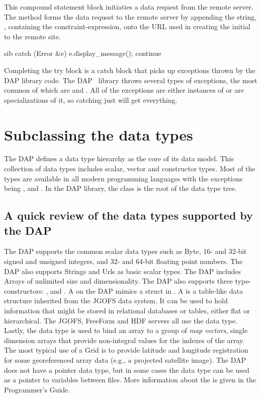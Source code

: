 \documentclass{dods-paper}
\begin{document}
This compound statement block initiaties a data request from the remote
server. The  method  forms the data request
to the remote server by appending the string, , containing the
constraint-expression, onto the URL used in creating the initial
 to the remote site.

\begin{vcode}{sib}
catch (Error &e) {
    e.display_message();
    continue
}
\end{vcode}
 
Completing the try block is a catch block that picks up exceptions thrown by
the DAP library code. The DAP \Cpp\ library throws several types of exceptions,
the most common of which are  and . All of
the exceptions are either instances of  or are specializations
of it, so catching just  will get everything.

\section{Subclassing the data types}

The DAP defines a data type hierarchy as the core of its data model. This
collection of data types includes scalar, vector and constructor types. Most
of the types are available in all modern programming languages with the
exceptions being ,  and . In the DAP
library, the class  is the root of the data type tree.

\subsection{A quick review of the data types supported by the DAP}

The DAP supports the common scalar data types such as Byte, 16- and 32-bit
signed and unsigned integers, and 32- and 64-bit floating point numbers. The
DAP also supports Strings and Urls as basic scalar types. The DAP includes
Arrays of unlimited size and dimensionality. The DAP also supports three
type-constructors: ,  and . A
 on the DAP mimics a struct in . A  is a
table-like data structure inherited from the JGOFS data system. It can be
used to hold information that might be stored in relational databases or
tables, either flat or hierarchical. The JGOFS, FreeForm and HDF servers all
use the  data type. Lastly, the  data type is used to
bind an array to a group of \emph{map vectors}, single dimension arrays that
provide non-integral values for the indexes of the array. The most typical
use of a Grid is to provide latitude and longitude registration for some
georeferenced array data (e.g., a projected satellite image). The DAP does
not have a pointer data type, but in some cases the  data type can
be used as a pointer to variables between files. More information about the
is given in the Programmer's Guide.
\end{document}
